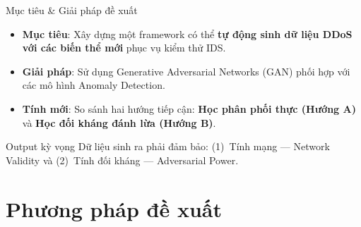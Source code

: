 \documentclass[aspectratio=169,11pt]{beamer}
\begin{document}
\begin{frame}{Mục tiêu \& Giải pháp đề xuất}
  \begin{itemize}\setlength\itemsep{8pt}
    \item \textbf{Mục tiêu}: Xây dựng một framework có thể \textbf{tự động
          sinh dữ liệu DDoS với các biến thể mới} phục vụ kiểm thử IDS.
    \item \textbf{Giải pháp}: Sử dụng Generative Adversarial Networks (GAN)
          phối hợp với các mô hình Anomaly Detection.
    \item \textbf{Tính mới}: So sánh hai hướng tiếp cận:
          \textbf{Học phân phối thực (Hướng A)} và
          \textbf{Học đối kháng đánh lừa (Hướng B)}.
  \end{itemize}
  \vspace{10pt}
  \begin{block}{Output kỳ vọng}
    Dữ liệu sinh ra phải đảm bảo:
    (1)~Tính mạng --- Network Validity và
    (2)~Tính đối kháng --- Adversarial Power.
  \end{block}
\end{frame}

\section{Phương pháp đề xuất}
\end{document}
